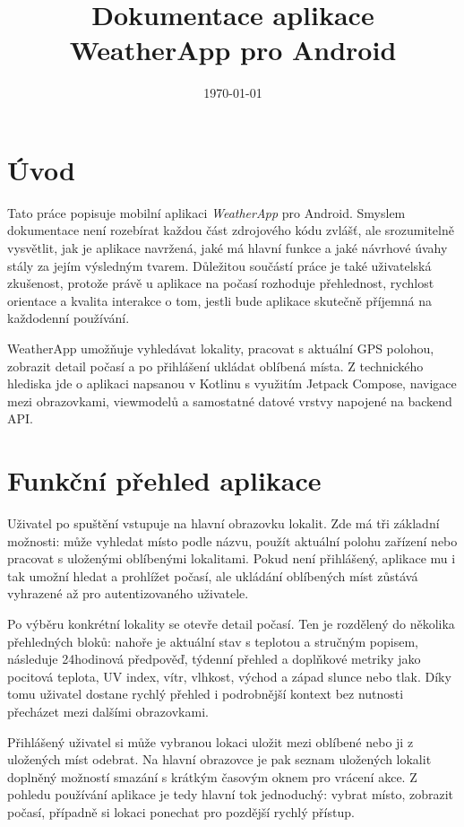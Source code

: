 \documentclass[12pt,a4paper]{article}
\title{Dokumentace aplikace WeatherApp pro Android}
\author{}
\date{\today}
\begin{document}
\maketitle

\section{Úvod}
Tato práce popisuje mobilní aplikaci \textit{WeatherApp} pro Android. Smyslem dokumentace není rozebírat každou část zdrojového kódu zvlášť, ale srozumitelně vysvětlit, jak je aplikace navržená, jaké má hlavní funkce a jaké návrhové úvahy stály za jejím výsledným tvarem. Důležitou součástí práce je také uživatelská zkušenost, protože právě u aplikace na počasí rozhoduje přehlednost, rychlost orientace a kvalita interakce o tom, jestli bude aplikace skutečně příjemná na každodenní používání.

WeatherApp umožňuje vyhledávat lokality, pracovat s aktuální GPS polohou, zobrazit detail počasí a po přihlášení ukládat oblíbená místa. Z technického hlediska jde o aplikaci napsanou v Kotlinu s využitím Jetpack Compose, navigace mezi obrazovkami, viewmodelů a samostatné datové vrstvy napojené na backend API.

\section{Funkční přehled aplikace}
Uživatel po spuštění vstupuje na hlavní obrazovku lokalit. Zde má tři základní možnosti: může vyhledat místo podle názvu, použít aktuální polohu zařízení nebo pracovat s uloženými oblíbenými lokalitami. Pokud není přihlášený, aplikace mu i tak umožní hledat a prohlížet počasí, ale ukládání oblíbených míst zůstává vyhrazené až pro autentizovaného uživatele.

Po výběru konkrétní lokality se otevře detail počasí. Ten je rozdělený do několika přehledných bloků: nahoře je aktuální stav s teplotou a stručným popisem, následuje 24hodinová předpověď, týdenní přehled a doplňkové metriky jako pocitová teplota, UV index, vítr, vlhkost, východ a západ slunce nebo tlak. Díky tomu uživatel dostane rychlý přehled i podrobnější kontext bez nutnosti přecházet mezi dalšími obrazovkami.

Přihlášený uživatel si může vybranou lokaci uložit mezi oblíbené nebo ji z uložených míst odebrat. Na hlavní obrazovce je pak seznam uložených lokalit doplněný možností smazání s krátkým časovým oknem pro vrácení akce. Z pohledu používání aplikace je tedy hlavní tok jednoduchý: vybrat místo, zobrazit počasí, případně si lokaci ponechat pro pozdější rychlý přístup.
\end{document}
